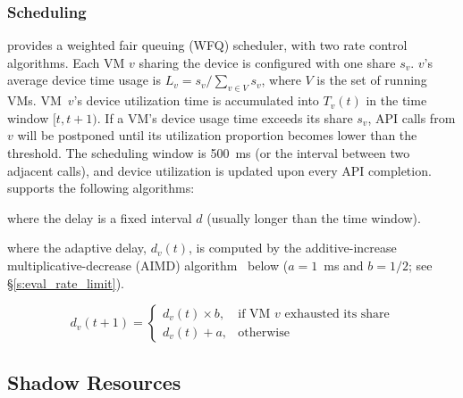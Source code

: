 \subsubsection{Scheduling}
\label{sub:scheduling}
\Model provides a weighted fair queuing (WFQ) scheduler, with two rate control algorithms.
Each VM $v$ sharing the device is configured with one share $s_v$.
$v$'s average device time usage is $L_v=s_v/\sum_{v\in V} s_v$, where $V$ is the set of running VMs.
VM~$v$'s device utilization time is accumulated into $T_v(t)$ in the time window $[t, t+1)$.
If a VM's device usage time exceeds its share $s_v$,
API calls from $v$ will be postponed until its utilization proportion becomes lower than the threshold.
The scheduling window is 500~ms (or the interval between two adjacent calls),
and device utilization is updated upon every API completion.
\Model supports the following algorithms:

 where the delay is a fixed interval $d$ (usually longer than the time window).

 where the adaptive delay, $d_v(t)$, is computed by the additive-increase multiplicative-decrease (AIMD) algorithm~\cite{aimd} below ($a=1$~ms and $b=1/2$; see \S\ref{s:eval_rate_limit}).

\[
d_v\left(t+1\right)=\begin{cases}
d_v\left(t\right)\times b, &\textrm{if VM $v$ exhausted its share}\\
d_v\left(t\right)+a, &\textrm{otherwise}
\end{cases}
\]

\subsection{Shadow Resources}
\label{s:multi_thread}
\label{s:shadow_buffer}

